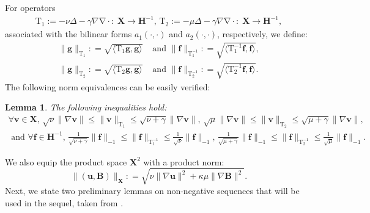 \documentclass[3p]{elsarticle}
\newtheorem{lemma}[theorem]{Lemma}
\def\V#1{\mathbf{#1}}
\def\VX{\mathbf{X}}
\newcommand{\divergence}{\mathrm{\nabla \cdot}}
\newcommand{\Lumap}{\mathrm{T_1}}
\newcommand{\Luinvmap}{\mathrm{T_1^{-1}}}
\newcommand{\Lbmap}{\mathrm{T_2}}
\newcommand{\Lbinvmap}{\mathrm{T_2^{-1}}}
\begin{document}
For operators 
\begin{align*}
    \Lumap:= -\nu \Delta - \gamma \nabla \divergence:\; \V{X}\rightarrow \V{H}^{-1} , \, 
    \Lbmap:= -\mu \Delta - \gamma \nabla \divergence:\; \V{X}\rightarrow \V{H}^{-1},
\end{align*}
associated with the bilinear forms $a_1(\cdot,\cdot)$ and $a_2(\cdot,\cdot)$, respectively, we define:
\begin{equation}
    \label{eq:Tnorm}
    \begin{aligned}
    \|\V{g}\|_{\Lumap}: = \sqrt{\langle \Lumap \V{g},\V{g} \rangle} &\text{ and } 
    \|\V{f}\|_{\Luinvmap}: = \sqrt{\langle \Luinvmap \V{f},\V{f} \rangle}, \\
    \|\V{g}\|_{\Lbmap}: = \sqrt{\langle \Lbmap \V{g},\V{g} \rangle} &\text{ and } 
    \|\V{f}\|_{\Lbinvmap}: = \sqrt{\langle \Lbinvmap \V{f},\V{f} \rangle}.
    \end{aligned}    
\end{equation}
%
% 
The following norm equivalences can be easily verified:
\begin{lemma}\cite{SIVS_Takhirov2026}
The following inequalities hold:
\begin{equation}
\begin{aligned}
\forall \V{v} \in \V{X}, \, \sqrt{\nu}\|\nabla \V{v}\| \le \| \V{v} \|_\Lumap \le \sqrt{\nu+\gamma} \|\nabla \V{v}\|, \, 
\sqrt{\mu}\|\nabla \V{v}\| \le \| \V{v} \|_\Lbmap \le \sqrt{\mu+\gamma} \|\nabla \V{v}\|, \\
\text{ and } \forall \V{f} \in \V{H}^{-1}, \, 
 \frac{1}{\sqrt{\nu+\gamma}}\| \V{f} \|_{-1} \le \| \V{f} \|_\Luinvmap \le \frac{1}{\sqrt{\nu}} \| \V{f} \|_{-1}, \, 
  \frac{1}{\sqrt{\mu+\gamma}}\| \V{f} \|_{-1} \le \| \V{f} \|_\Lbinvmap \le \frac{1}{\sqrt{\mu}} \| \V{f} \|_{-1}.
\end{aligned}
    \label{eq:NormEquiv}
\end{equation}    
\end{lemma}
We also equip the product space $\V{X}^2$ with a product norm:
\begin{equation}
    \label{eq:ProdNorm}
    \| (\V{u},\V{B})\|_\VX: = \sqrt{\nu \| \nabla \V{u}\|^2 + \kappa \mu \| \nabla \V{B}\|^2}.
\end{equation}
Next, we state two preliminary lemmas on non-negative sequences that will be used in the sequel, taken from \cite{Calcolo2026}.
\end{document}
